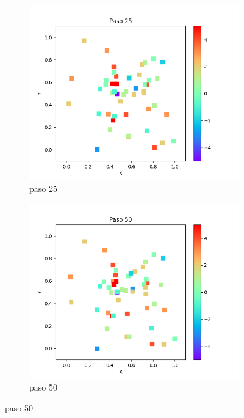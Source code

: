 \documentclass{article}
\begin{document}
\begin{figure}
       \centering
        \begin{subfigure}[b]{0.45\linewidth}
            \includegraphics[width=\linewidth]{p9p_t025.png}
            \caption{paso 25}	
            \label{f2.a}
        \end{subfigure}
\begin{subfigure}[b]{0.45\linewidth}
            \includegraphics[width=\linewidth]{p9p_t050.png}
            \caption{paso 50}
            \label{f2.b}
        \end{subfigure}

\end{figure}
\end{document}
